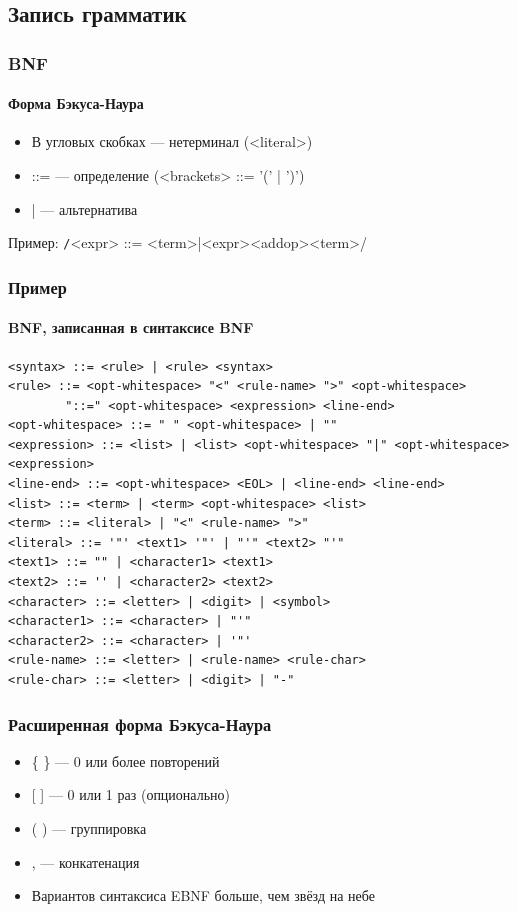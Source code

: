 \documentclass[xetex,mathserif,serif]{beamer}
\begin{document}
    \subsection{Запись грамматик}

    \begin{frame}
        \frametitle{BNF}
        \framesubtitle{Форма Бэкуса-Наура}
        \begin{itemize}
            \item В угловых скобках --- нетерминал (<literal>)
            \item ::= --- определение (<brackets> ::= '(' | ')')
            \item | --- альтернатива
        \end{itemize}
        Пример: \texttt/<expr> ::= <term>|<expr><addop><term>/
    \end{frame}

    \begin{frame}[fragile]
        \frametitle{Пример}
        \framesubtitle{BNF, записанная в синтаксисе BNF}
        \begin{footnotesize}
            \begin{verbatim}
<syntax> ::= <rule> | <rule> <syntax>
<rule> ::= <opt-whitespace> "<" <rule-name> ">" <opt-whitespace> 
        "::=" <opt-whitespace> <expression> <line-end>
<opt-whitespace> ::= " " <opt-whitespace> | ""
<expression> ::= <list> | <list> <opt-whitespace> "|" <opt-whitespace> <expression>
<line-end> ::= <opt-whitespace> <EOL> | <line-end> <line-end>
<list> ::= <term> | <term> <opt-whitespace> <list>
<term> ::= <literal> | "<" <rule-name> ">"
<literal> ::= '"' <text1> '"' | "'" <text2> "'"
<text1> ::= "" | <character1> <text1>
<text2> ::= '' | <character2> <text2>
<character> ::= <letter> | <digit> | <symbol>
<character1> ::= <character> | "'"
<character2> ::= <character> | '"'
<rule-name> ::= <letter> | <rule-name> <rule-char>
<rule-char> ::= <letter> | <digit> | "-"
            \end{verbatim}
        \end{footnotesize}
    \end{frame}

    \begin{frame}
        \frametitle{Расширенная форма Бэкуса-Наура}
        \begin{itemize}
            \item \{ \} --- 0 или более повторений
            \item {[ ]} --- 0 или 1 раз (опционально)
            \item ( ) --- группировка
            \item , --- конкатенация
            \item Вариантов синтаксиса EBNF больше, чем звёзд на небе
        \end{itemize}
    \end{frame}
\end{document}
